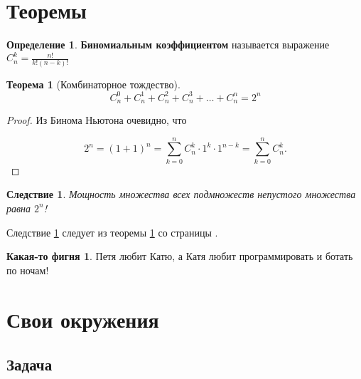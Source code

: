 \documentclass[12pt, a4paper]{article}
\theoremstyle{plain}              %
\newtheorem{theorem}{Теорема}[section]
\newtheorem{result}{Следствие}[theorem]
\theoremstyle{definition}         %
\newtheorem*{defin}{Определение}  %
\newtheorem{fignia}{Какая-то фигня}
\begin{document}



\section{Теоремы}
\begin{defin}
\textbf{ Биномиальным коэффициентом} называется выражение $C_n^k = \frac{n!}{k!(n-k)!}$
\end{defin}

\begin{theorem}[Комбинаторное тождество]\label{th:1}
 \[C_n^0 + C_n^1 + C_n^2 + C_n^3 + \ldots + C_n^n = 2^n \]
\end{theorem}
\begin{proof}
Из Бинома Ньютона очевидно, что

\[ 2^n = (1 + 1)^n = \sum_{k=0}^n C_n^k \cdot 1^k \cdot 1^{n-k} = \sum_{k=0}^n C_n^k. \]
\end{proof}

\begin{result} \label{sl:11}
Мощность множества всех подмножеств непустого множества равна $2^n$!
\end{result}

Следствие \ref{sl:11} следует из теоремы \ref{th:1} со страницы \pageref{th:1}.

\begin{fignia}
	 Петя любит Катю, а Катя любит программировать и ботать по ночам!
\end{fignia}


\section{Свои окружения}
\subsection{Задача}



\newenvironment{exercise}
{ %
\addtocounter{iexer}{1}  %
 {
   \noindent\ignorespaces   %
   \fontspec{Phorssa} %
   \textcolor{blue}{ \large  \textbf{Задача \arabic{iexer}}} %
 }

\vspace{2mm} %

\noindent \ignorespaces \color{green} \fontsize{15}{12ex}\selectfont
} %
{ %
\begin{center}
\begin{tikzpicture}
\draw[blue,fill=blue](2,2) circle [radius = 0.3];
\end{tikzpicture}
\end{center}
} %
\end{document}
